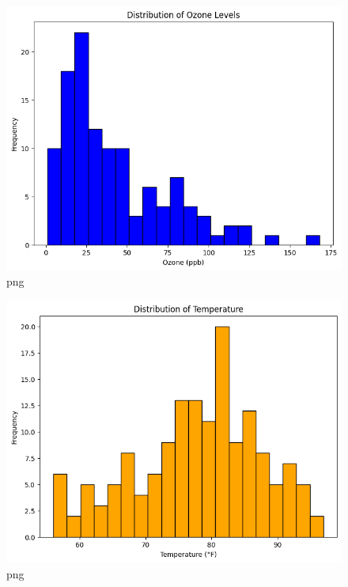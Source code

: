 \documentclass[
  letterpaper,
  DIV=11,
  numbers=noendperiod]{scrreprt}
\begin{document}
\begin{figure}[H]

{\centering \includegraphics{Tut2_Python_Tako_092024_files/Tut2_Python_Tako_092024_8_0.png}

}

\caption{png}

\end{figure}%
\begin{figure}[H]

{\centering \includegraphics{Tut2_Python_Tako_092024_files/Tut2_Python_Tako_092024_8_1.png}

}

\caption{png}

\end{figure}%
\end{document}
